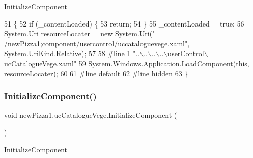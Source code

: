 Initialize\+Component 


\begin{DoxyCode}
51                                           \{
52             \textcolor{keywordflow}{if} (\_contentLoaded) \{
53                 \textcolor{keywordflow}{return};
54             \}
55             \_contentLoaded = \textcolor{keyword}{true};
56             \hyperlink{namespaceSystem}{System}.Uri resourceLocater = \textcolor{keyword}{new} \hyperlink{namespaceSystem}{System}.Uri(\textcolor{stringliteral}{"
      /newPizza1;component/usercontrol/uccataloguevege.xaml"}, \hyperlink{namespaceSystem}{System}.UriKind.Relative);
57             
58 \textcolor{preprocessor}{            #line 1 "..\(\backslash\)..\(\backslash\)..\(\backslash\)..\(\backslash\)userControl\(\backslash\)ucCatalogueVege.xaml"
}
59             \hyperlink{namespaceSystem}{System}.Windows.Application.LoadComponent(\textcolor{keyword}{this}, resourceLocater);
60             
61 \textcolor{preprocessor}{            #line default
}
62 \textcolor{preprocessor}{            #line hidden
}
63         \}
\end{DoxyCode}
\mbox{\label{classnewPizza1_1_1ucCatalogueVege_afc2e8f9dfd99c8252e745a8636e230da}} 
\subsubsection{\texorpdfstring{Initialize\+Component()}{InitializeComponent()}\hspace{0.1cm}{\footnotesize\ttfamily [4/6]}}
{\footnotesize\ttfamily void new\+Pizza1.\+uc\+Catalogue\+Vege.\+Initialize\+Component (\begin{DoxyParamCaption}{ }\end{DoxyParamCaption})\hspace{0.3cm}{\ttfamily [inline]}}



Initialize\+Component 


